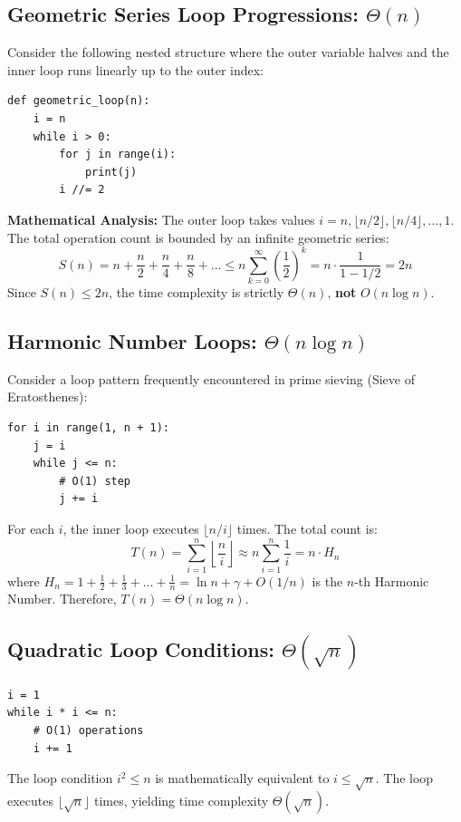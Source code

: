 \documentclass[11pt,a4paper]{article}
\begin{document}
\subsection{Geometric Series Loop Progressions: $\Theta(n)$}
Consider the following nested structure where the outer variable halves and the inner loop runs linearly up to the outer index:
\begin{lstlisting}[style=pythonstyle]
def geometric_loop(n):
    i = n
    while i > 0:
        for j in range(i):
            print(j)
        i //= 2
\end{lstlisting}
\textbf{Mathematical Analysis:} The outer loop takes values $i = n, \lfloor n/2 \rfloor, \lfloor n/4 \rfloor, \dots, 1$. The total operation count is bounded by an infinite geometric series:
\[
S(n) = n + \frac{n}{2} + \frac{n}{4} + \frac{n}{8} + \dots \le n \sum_{k=0}^{\infty} \left(\frac{1}{2}\right)^k = n \cdot \frac{1}{1 - 1/2} = 2n
\]
Since $S(n) \le 2n$, the time complexity is strictly $\Theta(n)$, \textbf{not} $O(n \log n)$.

\subsection{Harmonic Number Loops: $\Theta(n \log n)$}
Consider a loop pattern frequently encountered in prime sieving (Sieve of Eratosthenes):
\begin{lstlisting}[style=pythonstyle]
for i in range(1, n + 1):
    j = i
    while j <= n:
        # O(1) step
        j += i
\end{lstlisting}
For each $i$, the inner loop executes $\lfloor n / i \rfloor$ times. The total count is:
\[
T(n) = \sum_{i=1}^n \left\lfloor \frac{n}{i} \right\rfloor \approx n \sum_{i=1}^n \frac{1}{i} = n \cdot H_n
\]
where $H_n = 1 + \frac{1}{2} + \frac{1}{3} + \dots + \frac{1}{n} = \ln n + \gamma + O(1/n)$ is the $n$-th Harmonic Number. Therefore, $T(n) = \Theta(n \log n)$.

\subsection{Quadratic Loop Conditions: $\Theta(\sqrt{n})$}
\begin{lstlisting}[style=pythonstyle]
i = 1
while i * i <= n:
    # O(1) operations
    i += 1
\end{lstlisting}
The loop condition $i^2 \le n$ is mathematically equivalent to $i \le \sqrt{n}$. The loop executes $\lfloor \sqrt{n} \rfloor$ times, yielding time complexity $\Theta(\sqrt{n})$.
\end{document}
